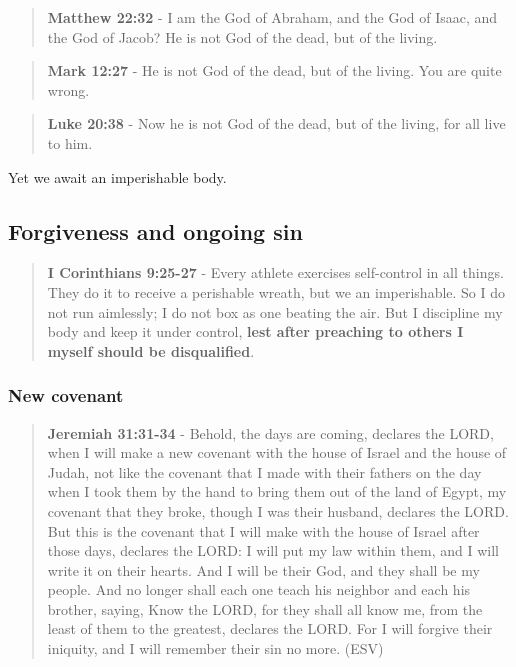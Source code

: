 \documentclass[11pt]{article}
\begin{document}
\begin{quote}
\textbf{Matthew 22:32} - I am the God of Abraham, and the God of Isaac, and the God of Jacob? He is not God of the dead, but of the living.
\end{quote}

\begin{quote}
\textbf{Mark 12:27} - He is not God of the dead, but of the living. You are quite wrong.
\end{quote}

\begin{quote}
\textbf{Luke 20:38} - Now he is not God of the dead, but of the living, for all live to him.
\end{quote}

Yet we await an imperishable body.

\subsection{Forgiveness and ongoing sin}
\label{sec:org18ab169}
\begin{quote}
\textbf{I Corinthians 9:25-27} - Every athlete exercises self-control in all things. They do it to receive a perishable wreath, but we an imperishable. So I do not run aimlessly; I do not box as one beating the air. But I discipline my body and keep it under control, \textbf{lest after preaching to others I myself should be disqualified}.
\end{quote}

\subsubsection{New covenant}
\label{sec:org2a22566}
\begin{quote}
\textbf{Jeremiah 31:31-34} - Behold, the days are coming, declares the LORD, when I will make a new covenant with the house of Israel and the house of Judah, not like the covenant that I made with their fathers on the day when I took them by the hand to bring them out of the land of Egypt, my covenant that they broke, though I was their husband, declares the LORD. But this is the covenant that I will make with the house of Israel after those days, declares the LORD: I will put my law within them, and I will write it on their hearts. And I will be their God, and they shall be my people. And no longer shall each one teach his neighbor and each his brother, saying, Know the LORD, for they shall all know me, from the least of them to the greatest, declares the LORD. For I will forgive their iniquity, and I will remember their sin no more. (ESV)
\end{quote}
\end{document}
